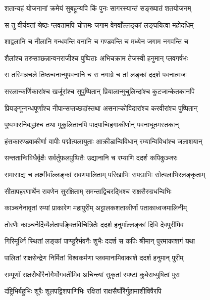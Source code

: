 \twolineshloka
{शतान्यहं योजनानां क्रमेयं सुबहून्यपि}
{किं पुनः सागरस्यान्तं सङ्ख्यातं शतयोजनम्} %

\twolineshloka
{स तु वीर्यवतां श्रेष्ठः प्लवतामपि चोत्तमः}
{जगाम वेगवाँल्लङ्कां लङ्घयित्वा महोदधिम्} %

\twolineshloka
{शाद्वलानि च नीलानि गन्धवन्ति वनानि च}
{गण्डवन्ति च मध्येन जगाम नगवन्ति च} %

\twolineshloka
{शैलांश्च तरुसञ्छन्नान्वनराजीश्च पुष्पिताः}
{अभिचक्राम तेजस्वी हनुमान् प्लवगर्षभः} %

\twolineshloka
{स तस्मिन्नचले तिष्ठन्वनान्युपवनानि च}
{स नगाग्रे च तां लङ्कां ददर्श पवनात्मजः} %

\twolineshloka
{सरलान्कर्णिकारांश्च खर्जूरांश्च सुपुष्पितान्}
{प्रियालान्मुचुलिन्दांश्च कुटजान्केतकानपि} %

\twolineshloka
{प्रियङ्गून्गन्धपूर्णांश्च नीपान्सप्तच्छदांस्तथा}
{असनान्कोविदारांश्च करवीरांश्च पुष्पितान्} %

\twolineshloka
{पुष्पभारनिबद्धांश्च तथा मुकुलितानपि}
{पादपान्विहगाकीर्णान् पवनाधूतमस्तकान्} %

\twolineshloka
{हंसकारण्डवाकीर्णा वापीः पद्मोत्पलायुताः}
{आक्रीडान्विविधान् रम्यान्विविधांश्च जलाशयान्} %

\twolineshloka
{सन्ततान्विविधैर्वृक्षैः सर्वर्तुफलपुष्पितैः}
{उद्यानानि च रम्याणि ददर्श कपिकुञ्जरः} %

\twolineshloka
{समासाद्य च लक्ष्मीवाँल्लङ्कां रावणपालिताम्}
{परिखाभिः सपद्माभिः सोत्पलाभिरलङ्कृताम्} %

\twolineshloka
{सीतापहरणार्थेन रावणेन सुरक्षिताम्}
{समन्ताद्विचरद्भिश्च राक्षसैरुग्रधन्विभिः} %

\twolineshloka
{काञ्चनेनावृतां रम्यां प्राकारेण महापुरीम्}
{अट्टालकशताकीर्णां पताकाध्वजमालिनीम्} %

\twolineshloka
{तोरणैः काञ्चनैर्दिव्यैर्लतापङ्क्तिविचित्रितैः}
{ददर्श हनुमाँल्लङ्कां दिवि देवपुरीमिव} %

\twolineshloka
{गिरिमूर्ध्नि स्थितां लङ्कां पाण्डुरैर्भवनैः शुभैः}
{ददर्श स कपिः श्रीमान् पुरमाकाशगं यथा} %

\twolineshloka
{पालितां राक्षसेन्द्रेण निर्मितां विश्वकर्मणा}
{प्लवमानामिवाकाशे ददर्श हनुमान् पुरीम्} %

\twolineshloka
{सम्पूर्णां राक्षसैर्घोरैर्नागैर्भोगवतीमिव}
{अचिन्त्यां सुकृतां स्पष्टां कुबेराध्युषितां पुरा} %

\twolineshloka
{दंष्ट्रिभिर्बहुभिः शूरैः शूलपट्टिशपाणिभिः}
{रक्षितां राक्षसैर्घोरैर्गुहामाशीविषैरपि} %

